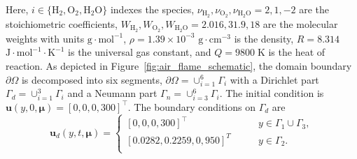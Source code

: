 \documentclass[3p,computermodern,11pt]{elsarticle}
\numberwithin{equation}{section}
\newcommand{\HTwo}{\mathrm{H}_2}
\newcommand{\OTwo}{\mathrm{O}_2}
\newcommand{\HTwoO}{\mathrm{H}_2\mathrm{O}}
\newcommand{\params}{\boldsymbol \mu}
\begin{document}
Here, $i\in \{\HTwo,\OTwo,\HTwoO\}$ indexes the species,  
$\nu_{\HTwo},\nu_{\OTwo},\nu_{\HTwoO} = 2,1,-2$ are the stoichiometric coefficients, $W_{\HTwo}, W_{\OTwo}, W_{\HTwoO} = 2.016, 31.9, 18$ are the molecular weights with units $\mathrm{g} \cdot \mathrm{mol}^{-1}$, $\rho = 1.39 \times 10^{-3}$ $\mathrm{g} \cdot \mathrm{cm}^{-3}$ is the density, $R = 8.314$ $\mathrm{J} \cdot  \mathrm{mol}^{-1} \cdot \mathrm{K}^{-1}$ is the universal gas constant, and $Q = 9800 \; \mathrm{K}$ is the heat of reaction. 
As depicted in Figure~\ref{fig:air_flame_schematic}, the domain boundary $\partial \Omega$ is decomposed into six segments, $\partial \Omega = \cup_{i=1}^6 \Gamma_i$ with a Dirichlet part $\Gamma_d = \cup_{i=1}^3 \Gamma_i$ and a Neumann part $\Gamma_n = \cup_{i=3}^6 \Gamma_i$. The initial condition is $\boldsymbol u(y,0,\params) = \left[0,0,0,300 \right]^\intercal$. The boundary conditions on $\Gamma_d$ are
$$\boldsymbol u_d(y,t,\params) = \begin{cases}
\left[0,0,0,300 \right]^\intercal \qquad &y \in \Gamma_1 \cup \Gamma_3, \\
\left[0.0282,0.2259,0,950 \right]^T \qquad &y  \in \Gamma_2. \\
\end{cases}
$$ 
\end{document}
